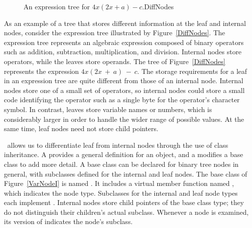 \begin{figure}
\vspace{-\bigskipamount}\vspace{-\bigskipamount}
\vspace{-\medskipamount}

{An expression tree for \(4x(2x + a) - c\).}{DiffNodes}
\vspace{-\medskipamount}
\end{figure}

As an example of a tree that stores different information at the leaf
and internal nodes, consider the expression tree illustrated by
Figure~\ref{DiffNodes}.
The expression tree represents an algebraic
expression
composed of binary operators such as addition, subtraction,
multiplication, and division.
Internal nodes store operators, while the leaves store operands.
The tree of Figure~\ref{DiffNodes} represents the expression
\(4x(2x~+~a)~-~c\).
The storage requirements for a leaf in an expression tree are quite
different from those of an internal node.
Internal nodes store one of a small set of operators,
so internal nodes could store a small code identifying the
operator such as a single byte for the operator's character symbol.
In contrast, leaves store variable names or numbers,
which is considerably larger in order
to handle the wider range of possible values.
At the same time, leaf nodes need not store child pointers.

\Lang\ allows us to differentiate leaf from internal
nodes through the use of class inheritance.
A  provides a general definition for an object,
and a  modifies a base class to add more detail.
A base class can be declared for binary tree nodes in general,
with subclasses defined for the internal and leaf nodes.
The base class of Figure~\ref{VarNodeI} is named .
It includes a virtual member function named
, which indicates the node type.
Subclasses for the internal and leaf node types each implement
.
Internal nodes store child pointers of the base class type; they do not
distinguish their children's actual subclass.
Whenever a node is examined, its version of  indicates
the node's subclass.

\begin{figure}

\bigskip
{}

\bigskip
{}

\bigskip
{}

\smallskip
\end{figure}

